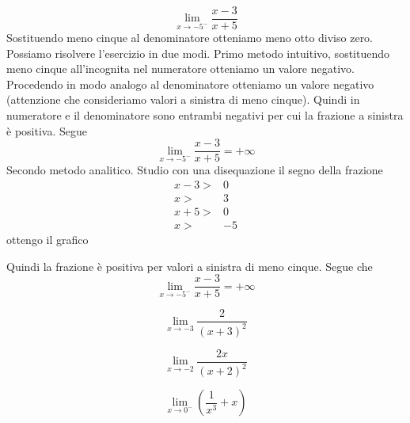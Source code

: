 \begin{exercise}
	\begin{equation*}
	\lim_{x\to -5^-}\dfrac{x-3}{x+5}
	\end{equation*}
	\tcblower
	Sostituendo meno cinque al denominatore otteniamo meno otto diviso zero. Possiamo risolvere l'esercizio in due modi. Primo metodo intuitivo, sostituendo meno cinque all'incognita  nel numeratore otteniamo un valore negativo. Procedendo in modo analogo al denominatore otteniamo un valore negativo (attenzione che consideriamo valori a sinistra di meno cinque). Quindi in numeratore e il denominatore sono entrambi negativi per cui la frazione a sinistra è positiva. Segue \begin{equation*}
	\lim_{x\to -5^-}\dfrac{x-3}{x+5}=+\infty
	\end{equation*} Secondo metodo analitico. Studio con una disequazione il segno della frazione
	\begin{align*}
	x-3>&0\\
	x>&3\\
	x+5>&0\\
	x>&-5
	\end{align*} 
	ottengo il grafico
	\begin{center}
		
	\end{center}
	Quindi la frazione è positiva per valori a sinistra di meno cinque. Segue che 
	\begin{equation*}
		\lim_{x\to -5^-}\dfrac{x-3}{x+5}=+\infty
	\end{equation*}
\end{exercise}
	\begin{exercise}[no solution]
	\begin{equation*}
	\lim_{x\to -3}\dfrac{2}{(x+3)^2}
	\end{equation*}
\end{exercise}
	\begin{exercise}[no solution]
	\begin{equation*}
	\lim_{x\to -2}\dfrac{2x}{(x+2)^2}
	\end{equation*}
\end{exercise}
	\begin{exercise}[no solution]
	\begin{equation*}
	\lim_{x\to 0^-}\left(\dfrac{1}{x^3}+x\right)
	\end{equation*}
\end{exercise}

